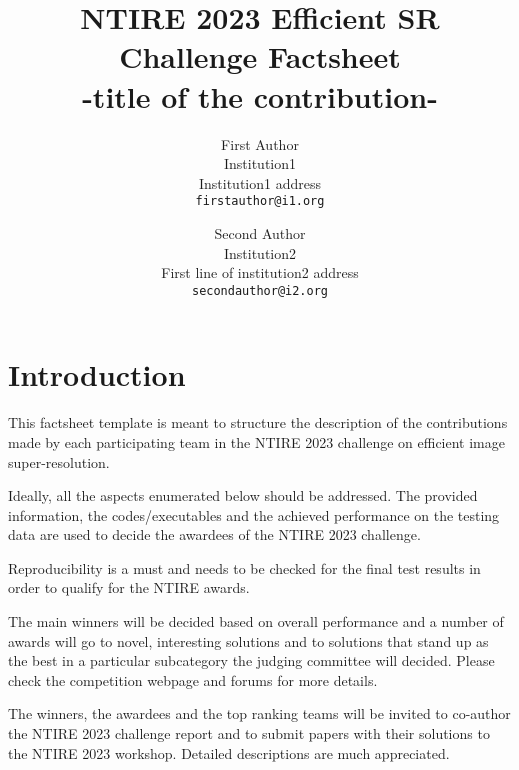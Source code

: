 \documentclass[10pt,twocolumn,letterpaper]{article}
\begin{document}
\title{NTIRE 2023 Efficient SR Challenge Factsheet\\-title of the contribution-}

\author{First Author\\
Institution1\\
Institution1 address\\
{\tt\small firstauthor@i1.org}
\and
Second Author\\
Institution2\\
First line of institution2 address\\
{\tt\small secondauthor@i2.org}
}
\maketitle

\section{Introduction}

This factsheet template is meant to structure the description of the contributions made by each participating team in the NTIRE 2023 challenge on efficient image super-resolution. 

Ideally, all the aspects enumerated below should be addressed.
The provided information, the codes/executables and the achieved performance on the testing data are used to decide the awardees of the NTIRE 2023 challenge. 

Reproducibility is a must and needs to be checked for the final test results in order to qualify for the NTIRE awards. 

The main winners will be decided based on overall performance and a number of awards will go to novel, interesting solutions and to solutions that stand up as the best in a particular subcategory the judging committee will decided. Please check the competition webpage and forums for more details.

The winners, the awardees and the top ranking teams will be invited to co-author the NTIRE 2023 challenge report and to submit papers with their solutions to the NTIRE 2023 workshop. Detailed descriptions are much appreciated.
\end{document}

